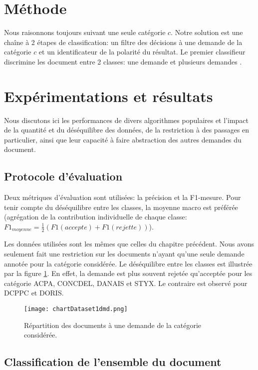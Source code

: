 \section{Méthode}
Nous raisonnons toujours suivant une seule catégorie $c$. Notre solution est une chaîne à 2 étapes de classification: un filtre des décisions à une demande de la catégorie $c$ et un identificateur de la polarité du résultat. Le premier classifieur discrimine les document entre 2 classes: \og une demande \fg{} et \og plusieurs demandes \fg{}.

\section{Expérimentations et résultats}
\label{sec:sensresultat:experimentations}
Nous discutons ici les performances de divers algorithmes populaires et l'impact de la quantité et du déséquilibre des données, de la restriction à des passages en particulier, ainsi que leur capacité à faire abstraction des autres demandes du document. 

\subsection{Protocole d'évaluation}
Deux métriques d'évaluation sont utilisées: la précision et la F1-mesure. Pour tenir compte du déséquilibre entre les classes, la moyenne macro est préférée (agrégation de la contribution individuelle de chaque classe: $F1_{moyenne} = \frac{1}{2}(F1({accepte}) + F1({rejette}))$).

Les données utilisées sont les mêmes que celles du chapitre précédent. Nous avons seulement fait une restriction sur les documents n'ayant qu'une seule demande annotée pour la catégorie considérée. Le déséquilibre entre les classes est illustrée par la figure \ref{fig:sensresultat:stat-1dmd}. En effet, la demande est plus souvent rejetée qu'acceptée pour les catégorie ACPA, CONCDEL, DANAIS et STYX. Le contraire est observé pour DCPPC et DORIS.
\begin{figure}[htb]
\texttt{[image: chartDataset1dmd.png]}
\caption{Répartition des documents à une demande de la catégorie considérée.}\label{fig:sensresultat:stat-1dmd}
\end{figure}

\subsection{Classification de l'ensemble du document}

